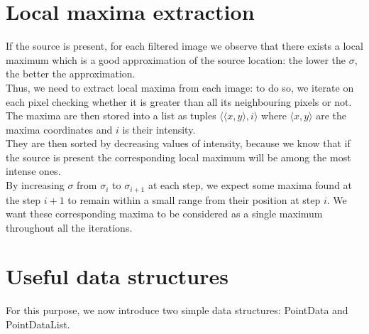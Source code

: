 \documentclass[a4paper,12pt,oneside]{book}
\begin{document}
\begin{onehalfspace}
	\section{Local maxima extraction}
	If the source is present, for each filtered image we observe that there exists a local maximum which is a good approximation of the source location: the lower the $\sigma$, the better the approximation. \\
	Thus, we need to extract local maxima from each image: to do so, we iterate on each pixel checking whether it is greater than all its neighbouring pixels or not. \newpage The maxima are then stored into a list as tuples $\langle \langle x,y \rangle, i \rangle$ where $\langle x, y \rangle$ are the maxima coordinates and $i$ is their intensity. \\
	They are then sorted by decreasing values of intensity, because we know that if the source is present the corresponding local maximum will be among the most intense ones. \\
	By increasing $\sigma$ from $\sigma_i$ to $\sigma_{i+1}$ at each step, we expect some maxima found at the step $i+1$ to remain within a small range from their position at step $i$. We want these corresponding maxima to be considered as a single maximum throughout all the iterations.
	
	\section{Useful data structures}
	For this purpose, we now introduce two simple data structures: PointData and PointDataList.

\end{onehalfspace}
\end{document}
